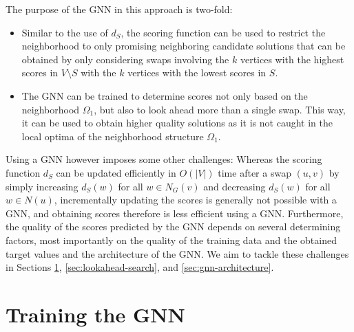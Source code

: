 \documentclass[draft,final]{vutinfth} %
\begin{document}
The purpose of the GNN in this approach is two-fold: 
\begin{itemize}
    \item Similar to the use of $d_S$, the scoring function can be used to restrict the neighborhood to only promising neighboring candidate solutions that can be obtained by only considering swaps involving the $k$ vertices with the highest scores in $V \setminus S$ with the $k$ vertices with the lowest scores in $S$. 
    \item The GNN can be trained to determine scores not only based on the neighborhood $\Omega_1$, but also to look ahead more than a single swap. This way, it can be used to obtain higher quality solutions as it is not caught in the local optima of the neighborhood structure $\Omega_1$.
\end{itemize}

Using a GNN however imposes some other challenges: 
Whereas the scoring function $d_S$ can be updated efficiently in $O(|V|)$ time after a swap $(u,v)$ by simply increasing $d_S(w)$ for all $w \in N_G(v)$ and decreasing $d_S(w)$ for all $w \in N(u)$, incrementally updating the scores is generally not possible with a GNN, and obtaining scores therefore is less efficient using a GNN. 
Furthermore, the quality of the scores predicted by the GNN depends on several determining factors, most importantly on the quality of the training data and the obtained target values and the architecture of the GNN. 
We aim to tackle these challenges in Sections \ref{sec:gnn-training}, \ref{sec:lookahead-search}, and \ref{sec:gnn-architecture}.

\section{Training the GNN}\label{sec:gnn-training}
\end{document}
